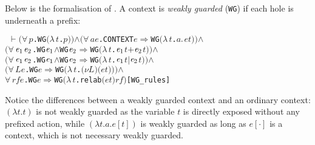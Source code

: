 \documentclass[GCNS]{yincog}
\renewcommand{\HOLinline}[1]{\mbox{\textup{\texttt{#1}}}}
\renewcommand{\HOLConst}[1]{\texttt{#1}}
\renewcommand{\HOLBoundVar}[1]{\ensuremath{\mathit{#1}}}
\renewcommand{\HOLSymConst}[1]{#1}
\renewcommand{\HOLTokenConj}{\ensuremath{\wedge}}
\renewcommand{\HOLTokenForall}{\ensuremath{\forall \,}}
\renewcommand{\HOLTokenLambda}{\ensuremath{\lambda \,}}
\renewcommand{\HOLTokenTurnstile}{\ensuremath{\:\:\vdash}}
\theoremstyle{remark}
\theoremstyle{theorem}
\theoremstyle{remark}
\renewcommand{\HOLTokenImp}{\ensuremath{\Longrightarrow}}
\begin{document}
Below is the formalisation of . A context is
\emph{weakly guarded} (\HOLinline{\HOLConst{WG}}) if each hole is underneath
a prefix:
%
\begin{alltt}
\HOLTokenTurnstile{} \ensuremath{(}\HOLSymConst{\HOLTokenForall{}}\HOLBoundVar{p}. \HOLConst{WG} \ensuremath{(}\HOLTokenLambda{}\HOLBoundVar{t}. \HOLBoundVar{p}\ensuremath{)}\ensuremath{)} \HOLSymConst{\HOLTokenConj{}} \ensuremath{(}\HOLSymConst{\HOLTokenForall{}}\HOLBoundVar{a} \HOLBoundVar{e}. \HOLConst{CONTEXT} \HOLBoundVar{e} \HOLSymConst{\HOLTokenImp{}} \HOLConst{WG} \ensuremath{(}\HOLTokenLambda{}\HOLBoundVar{t}. \HOLBoundVar{a}\HOLSymConst{\ensuremath{\ldotp}}\HOLBoundVar{e} \HOLBoundVar{t}\ensuremath{)}\ensuremath{)} \HOLSymConst{\HOLTokenConj{}}
   \ensuremath{(}\HOLSymConst{\HOLTokenForall{}}\ensuremath{\HOLBoundVar{e}\sb{\mathrm{1}}} \ensuremath{\HOLBoundVar{e}\sb{\mathrm{2}}}. \HOLConst{WG} \ensuremath{\HOLBoundVar{e}\sb{\mathrm{1}}} \HOLSymConst{\HOLTokenConj{}} \HOLConst{WG} \ensuremath{\HOLBoundVar{e}\sb{\mathrm{2}}} \HOLSymConst{\HOLTokenImp{}} \HOLConst{WG} \ensuremath{(}\HOLTokenLambda{}\HOLBoundVar{t}. \ensuremath{\HOLBoundVar{e}\sb{\mathrm{1}}} \HOLBoundVar{t} \HOLSymConst{\ensuremath{+}} \ensuremath{\HOLBoundVar{e}\sb{\mathrm{2}}} \HOLBoundVar{t}\ensuremath{)}\ensuremath{)} \HOLSymConst{\HOLTokenConj{}}
   \ensuremath{(}\HOLSymConst{\HOLTokenForall{}}\ensuremath{\HOLBoundVar{e}\sb{\mathrm{1}}} \ensuremath{\HOLBoundVar{e}\sb{\mathrm{2}}}. \HOLConst{WG} \ensuremath{\HOLBoundVar{e}\sb{\mathrm{1}}} \HOLSymConst{\HOLTokenConj{}} \HOLConst{WG} \ensuremath{\HOLBoundVar{e}\sb{\mathrm{2}}} \HOLSymConst{\HOLTokenImp{}} \HOLConst{WG} \ensuremath{(}\HOLTokenLambda{}\HOLBoundVar{t}. \ensuremath{\HOLBoundVar{e}\sb{\mathrm{1}}} \HOLBoundVar{t} \HOLSymConst{\ensuremath{\mid}} \ensuremath{\HOLBoundVar{e}\sb{\mathrm{2}}} \HOLBoundVar{t}\ensuremath{)}\ensuremath{)} \HOLSymConst{\HOLTokenConj{}}
   \ensuremath{(}\HOLSymConst{\HOLTokenForall{}}\HOLBoundVar{L} \HOLBoundVar{e}. \HOLConst{WG} \HOLBoundVar{e} \HOLSymConst{\HOLTokenImp{}} \HOLConst{WG} \ensuremath{(}\HOLTokenLambda{}\HOLBoundVar{t}. \ensuremath{(\nu}\HOLBoundVar{L}\ensuremath{)} \ensuremath{(}\HOLBoundVar{e} \HOLBoundVar{t}\ensuremath{)}\ensuremath{)}\ensuremath{)} \HOLSymConst{\HOLTokenConj{}}
   \HOLSymConst{\HOLTokenForall{}}\HOLBoundVar{rf} \HOLBoundVar{e}. \HOLConst{WG} \HOLBoundVar{e} \HOLSymConst{\HOLTokenImp{}} \HOLConst{WG} \ensuremath{(}\HOLTokenLambda{}\HOLBoundVar{t}. \HOLConst{relab} \ensuremath{(}\HOLBoundVar{e} \HOLBoundVar{t}\ensuremath{)} \HOLBoundVar{rf}\ensuremath{)}\hfill{[WG\_rules]}
\end{alltt}
%
Notice the differences between a weakly guarded context and an ordinary
context: $(\lambda t. t)$ is not weakly guarded as the variable $t$ is
directly exposed without any prefixed action, while
$(\lambda t. a.e[t])$ is weakly guarded as long as $e[\cdot ]$ is a context,
which is not necessary weakly guarded.
\end{document}
